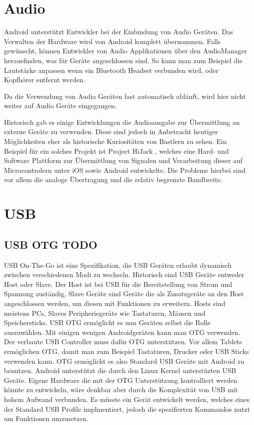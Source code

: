 \documentclass[12pt,journal,compsoc]{IEEEtran}
\begin{document}
\section{Audio}
Android unterstützt Entwickler bei der Einbindung von Audio Geräten. Das Verwalten der Hardware wird von Android komplett übernommen.
Falls gewünscht, können Entwickler von Audio Applikationen über den AudioManager herausfinden, was für Geräte angeschlossen sind. So kann man zum Beispiel die Lautstärke anpassen wenn ein Bluetooth Headset verbunden wird, oder Kopfhörer entfernt werden.

Da die Verwendung von Audio Geräten fast automatisch abläuft, wird hier nicht weiter auf Audio Geräte eingegangen.

Historisch gab es einige Entwicklungen die Audioausgabe zur Übermittlung an externe Geräte zu verwenden. Diese sind jedoch in Anbetracht heutiger Möglichkeiten eher als historische Kuriositäten von Bastlern zu sehen.
Ein Beispiel für ein solches Projekt ist Project HiJack \cite{hijack} , welches eine Hard- und Software Plattform zur Übermittlung von Signalen und Verarbeitung dieser auf Microcontrolern unter iOS sowie Android entwickelte.
Die Probleme hierbei sind vor allem die analoge Übertragung und die relativ begrenzte Bandbreite.

\section{USB}

\subsection{USB OTG TODO}
USB On-The-Go ist eine Spezifikation, die USB Geräten erlaubt dynamisch zwischen verschiedenen Modi zu wechseln. Historisch sind USB Geräte entweder Host oder Slave.
Der Host ist bei USB für die Bereitstellung von Strom und Spannung zuständig, Slave Geräte sind Geräte die als Zusatzgeräte an den Host angeschlossen werden, um diesen mit Funktionen zu erweitern.
Hosts sind meistens PCs, Slaves Peripheriegeräte wie Tastaturen, Mäusen und Speichersticks.
USB OTG ermöglicht es nun Geräten selbst die Rolle auszuwählen.
Mit einigen wenigen Androidgeräten kann man OTG verwenden. Der verbaute USB Controller muss dafür OTG unterstützen.
Vor allem Tablets ermöglichen OTG, damit man zum Beispiel Tastaturen, Drucker oder USB Sticks verwenden kann.
OTG ermöglicht es also Standard USB Geräte mit Android zu benutzen. Android unterstützt die durch den Linux Kernel unterstüzten USB Geräte. Eigene Hardware die mit der OTG Unterstützung kontrolliert werden könnte zu entwickeln, wäre denkbar aber durch die Komplexität von USB mit hohem Aufwand verbunden.
Es müsste ein Gerät entwickelt werden, welches eines der Standard USB Profile implmentiert, jedoch die spezifierten Kommandos nutzt um Funktionen umzusetzen.
\end{document}
